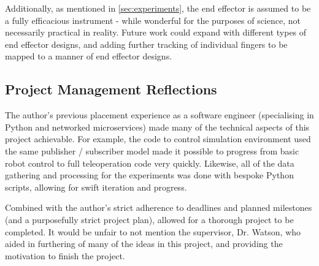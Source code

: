   Additionally, as mentioned in \autoref{sec:experiments}, the end effector is assumed to be a fully efficacious instrument - while wonderful for the purposes of science, not necessarily practical in reality.
  Future work could expand with different types of end effector designs, and adding further tracking of individual fingers to be mapped to a manner of end effector designs.

  \subsection{Project Management Reflections}

  The author's previous placement experience as a software engineer (specialising in Python and networked microservices) made many of the technical aspects of this project achievable.
  For example, the code to control simulation environment used the same publisher / subscriber model made it possible to progress from basic robot control to full teleoperation code very quickly.
  Likewise, all of the data gathering and processing for the experiments was done with bespoke Python scripts, allowing for swift iteration and progress.
  
  Combined with the author's strict adherence to deadlines and planned milestones (and a purposefully strict project plan), allowed for a thorough project to be completed.
  It would be unfair to not mention the supervisor, Dr. Watson, who aided in furthering of many of the ideas in this project, and providing the motivation to finish the project.

\printbibliography[title={References},heading=bibintoc] %



